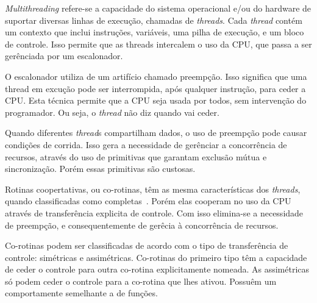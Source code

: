 \textit{Multithreading} refere-se a capacidade do sistema operacional e/ou do hardware de suportar diversas linhas de
execução, chamadas de \textit{threads}. Cada \textit{thread} contém um contexto que inclui instruções, variáveis, uma 
pilha de execução, e um bloco de controle. Isso permite que as threads intercalem o uso da CPU, que passa a ser
gerênciada por um escalonador.

O escalonador utiliza de um artifício chamado preempção. Isso significa que uma thread em excução pode ser interrompida, 
após qualquer instrução, para ceder a CPU. Esta técnica permite que a CPU seja usada por todos, sem intervenção
do programador. Ou seja, o \textit{thread} não diz quando vai ceder. 

Quando diferentes \textit{thread}s compartilham dados, o uso de preempção pode causar condições de corrida. Isso gera a
necessidade de gerênciar a concorrência de recursos, através do uso de primitivas que garantam exclusão mútua e sincronização.
Porém essas primitivas são custosas.~\cite{Stallings/04}

Rotinas coopertativas, ou co-rotinas, têm as mesma características dos \textit{threads}, quando classificadas como
completas~\cite[s. 2.4]{Moura/04}. Porém elas cooperam no uso da CPU através de transferência explicita de controle. Com
isso elimina-se a necessidade de preempção, e consequentemente de gerêcia à concorrência de recursos.

Co-rotinas podem ser classificadas de acordo com o tipo de transferência de controle: simétricas e assimétricas. 
Co-rotinas do primeiro tipo têm a capacidade de ceder o controle para outra co-rotina explicitamente nomeada.
As assimétricas só podem ceder o controle para a co-rotina que lhes ativou. Possuêm um comportamente semelhante a de
funções.~\cite{Moura/04}

